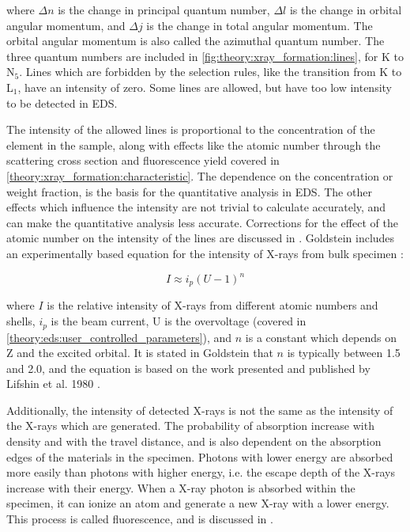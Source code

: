 where $\Delta n$ is the change in principal quantum number, $\Delta l$ is the change in orbital angular momentum, and $\Delta j$ is the change in total angular momentum.
The orbital angular momentum is also called the azimuthal quantum number.
The three quantum numbers are included in \cref{fig:theory:xray_formation:lines}, for K to N$_5$.
Lines which are forbidden by the selection rules, like the transition from K to L$_1$, have an intensity of zero.
Some lines are allowed, but have too low intensity to be detected in EDS.

The intensity of the allowed lines is proportional to the concentration of the element in the sample, along with effects like the atomic number through the scattering cross section and fluorescence yield covered in \cref{theory:xray_formation:characteristic}.
The dependence on the concentration or weight fraction, is the basis for the quantitative analysis in EDS.
The other effects which influence the intensity are not trivial to calculate accurately, and can make the quantitative analysis less accurate.
Corrections for the effect of the atomic number on the intensity of the lines are discussed in .
Goldstein includes an experimentally based equation for the intensity of X-rays from bulk specimen \cite[Eq. 4.8]{goldstein_scanning_2018}:

\begin{equation}
    \label{eq:theory:xray_formation:intensity}
    I \approx i_p (U-1)^n
\end{equation}

where $I$ is the relative intensity of X-rays from different atomic numbers and shells, $i_p$ is the beam current, U is the overvoltage (covered in \cref{theory:eds:user_controlled_parameters}), and $n$ is a constant which depends on Z and the excited orbital.
It is stated in Goldstein that $n$ is typically between 1.5 and 2.0, and the equation is based on the work presented and published by Lifshin et al. 1980 \cite{lifshin1980}.


Additionally, the intensity of detected X-rays is not the same as the intensity of the X-rays which are generated.
The probability of absorption increase with density and with the travel distance, and is also dependent on the absorption edges of the materials in the specimen.
Photons with lower energy are absorbed more easily than photons with higher energy, i.e. the escape depth of the X-rays increase with their energy.
When a X-ray photon is absorbed within the specimen, it can ionize an atom and generate a new X-ray with a lower energy.
This process is called fluorescence, and is discussed in .


